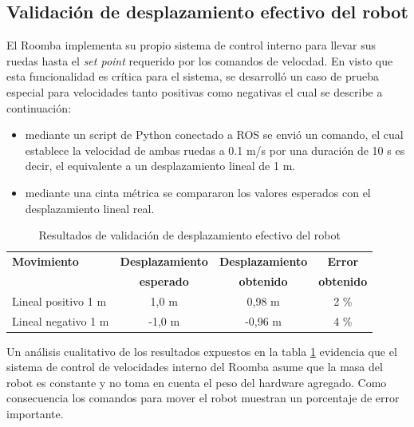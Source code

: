 \subsection{Validación de desplazamiento efectivo del robot}

El Roomba implementa su propio sistema de control interno para llevar sus ruedas hasta el \textit{set point} requerido por los comandos de velocdad. En visto que esta funcionalidad es crítica para el sistema, se desarrolló un caso de prueba especial para velocidades tanto positivas como negativas el cual se describe a continuación:

\begin{itemize}
    \item mediante un script de Python conectado a ROS se envió un comando, el cual establece la velocidad de ambas ruedas a 0.1 m/s por una duración de 10 s es decir, el equivalente a un desplazamiento lineal de 1 m.
    \item mediante una cinta métrica se compararon los valores esperados con el desplazamiento lineal real.
\end{itemize}

\begin{table}
    \centering
    \caption[Desplazamiento robot]{Resultados de validación de desplazamiento efectivo del robot}
    \begin{tabular}{lccc}
        \toprule
        \textbf{Movimiento} & \textbf{Desplazamiento} & \textbf{Desplazamiento} & \textbf{Error}    \\
                            & \textbf{esperado}       & \textbf{obtenido}       & \textbf{obtenido} \\
        \midrule
        Lineal positivo 1 m & 1,0 m                   & 0,98 m                  & 2 \%              \\
        Lineal negativo 1 m & -1,0 m                  & -0,96 m                 & 4 \%              \\
        \bottomrule
        \hline
    \end{tabular}
    \label{tab:desplazamientoRobot}
\end{table}

Un análisis cualitativo de los resultados expuestos en la tabla \ref{tab:desplazamientoRobot} evidencia que el sistema de control de velocidades interno del Roomba asume que la masa del robot es constante y no toma en cuenta el peso del hardware agregado. Como consecuencia los comandos para mover el robot muestran un porcentaje de error importante.

